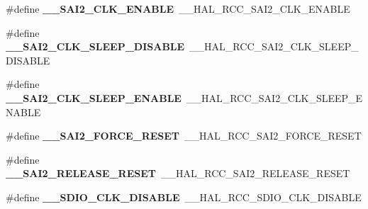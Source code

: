 \begin{DoxyCompactItemize}
\item 
\#define {\bfseries \+\_\+\+\_\+\+S\+A\+I2\+\_\+\+C\+L\+K\+\_\+\+E\+N\+A\+B\+LE}~\+\_\+\+\_\+\+H\+A\+L\+\_\+\+R\+C\+C\+\_\+\+S\+A\+I2\+\_\+\+C\+L\+K\+\_\+\+E\+N\+A\+B\+LE\hypertarget{group___h_a_l___r_c_c___aliased_ga918b0825bcbcaadad3cf40c7127c8322}{}\label{group___h_a_l___r_c_c___aliased_ga918b0825bcbcaadad3cf40c7127c8322}

\item 
\#define {\bfseries \+\_\+\+\_\+\+S\+A\+I2\+\_\+\+C\+L\+K\+\_\+\+S\+L\+E\+E\+P\+\_\+\+D\+I\+S\+A\+B\+LE}~\+\_\+\+\_\+\+H\+A\+L\+\_\+\+R\+C\+C\+\_\+\+S\+A\+I2\+\_\+\+C\+L\+K\+\_\+\+S\+L\+E\+E\+P\+\_\+\+D\+I\+S\+A\+B\+LE\hypertarget{group___h_a_l___r_c_c___aliased_ga3a28b6eb8d71db32559ae19c0c451588}{}\label{group___h_a_l___r_c_c___aliased_ga3a28b6eb8d71db32559ae19c0c451588}

\item 
\#define {\bfseries \+\_\+\+\_\+\+S\+A\+I2\+\_\+\+C\+L\+K\+\_\+\+S\+L\+E\+E\+P\+\_\+\+E\+N\+A\+B\+LE}~\+\_\+\+\_\+\+H\+A\+L\+\_\+\+R\+C\+C\+\_\+\+S\+A\+I2\+\_\+\+C\+L\+K\+\_\+\+S\+L\+E\+E\+P\+\_\+\+E\+N\+A\+B\+LE\hypertarget{group___h_a_l___r_c_c___aliased_gad98dccd681d974c77f35066e0bc25026}{}\label{group___h_a_l___r_c_c___aliased_gad98dccd681d974c77f35066e0bc25026}

\item 
\#define {\bfseries \+\_\+\+\_\+\+S\+A\+I2\+\_\+\+F\+O\+R\+C\+E\+\_\+\+R\+E\+S\+ET}~\+\_\+\+\_\+\+H\+A\+L\+\_\+\+R\+C\+C\+\_\+\+S\+A\+I2\+\_\+\+F\+O\+R\+C\+E\+\_\+\+R\+E\+S\+ET\hypertarget{group___h_a_l___r_c_c___aliased_gad4787448c5006a6d9e7839e922d7b851}{}\label{group___h_a_l___r_c_c___aliased_gad4787448c5006a6d9e7839e922d7b851}

\item 
\#define {\bfseries \+\_\+\+\_\+\+S\+A\+I2\+\_\+\+R\+E\+L\+E\+A\+S\+E\+\_\+\+R\+E\+S\+ET}~\+\_\+\+\_\+\+H\+A\+L\+\_\+\+R\+C\+C\+\_\+\+S\+A\+I2\+\_\+\+R\+E\+L\+E\+A\+S\+E\+\_\+\+R\+E\+S\+ET\hypertarget{group___h_a_l___r_c_c___aliased_gaa733091031d11ce795ed05d634e39ee7}{}\label{group___h_a_l___r_c_c___aliased_gaa733091031d11ce795ed05d634e39ee7}

\item 
\#define {\bfseries \+\_\+\+\_\+\+S\+D\+I\+O\+\_\+\+C\+L\+K\+\_\+\+D\+I\+S\+A\+B\+LE}~\+\_\+\+\_\+\+H\+A\+L\+\_\+\+R\+C\+C\+\_\+\+S\+D\+I\+O\+\_\+\+C\+L\+K\+\_\+\+D\+I\+S\+A\+B\+LE\hypertarget{group___h_a_l___r_c_c___aliased_ga582de62052cae4fb4a6955b515856c1b}{}\label{group___h_a_l___r_c_c___aliased_ga582de62052cae4fb4a6955b515856c1b}


\end{DoxyCompactItemize}
